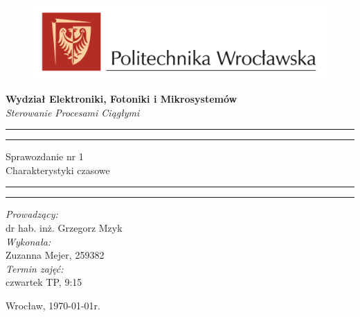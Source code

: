 \begin{titlepage}
\begin{figure}
    \centering
    \includegraphics[width=18cm]{logo-PWr.png}
    \label{fig:pwr}
\end{figure}
    \begin{center}
        \LARGE \textbf{ Wydział Elektroniki, Fotoniki i Mikrosystemów }\\ 
        \vspace{70pt}
        \Huge \textit{ Sterowanie Procesami Ciągłymi}  \\
    \end{center}
    \vspace{30pt}
    \hrule
    \vspace{1pt}
    \hrule
    \begin{center}
        {\fontsize{30}{50}\selectfont Sprawozdanie nr 1\\ }
        \vspace{10pt}
        {\fontsize{25}{25}\selectfont Charakterystyki czasowe  }
    \end{center}
    \hrule
    \vspace{1pt}
    \hrule
    \begin{flushright}
        \vspace{50pt}

        \textit{\Large Prowadzący:}\\
        \Large dr hab. inż. Grzegorz Mzyk\\
        \vspace{10pt}
        \textit{\Large Wykonała:}\\
        \Large Zuzanna Mejer, 259382 \\
        \vspace{10pt}
        \textit{\Large Termin zajęć:}\\
        \Large czwartek TP, 9:15\\
        \vspace{10pt}
    
    \end{flushright}
    \vspace{60pt}
    \begin{center}
        \large Wrocław, \today r.
    \end{center}
\end{titlepage}
    
    